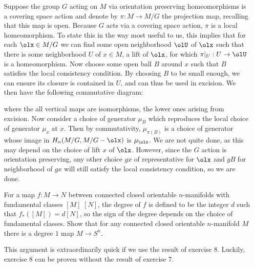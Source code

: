 \begin{homework}[e]
  \begin{prf}
    Suppose the group $G$ acting on $M$ via orientation preserving homeomorphisms is a covering space action and denote by $\pi:M\to M/G$ the projection map, recalling that this map is open. Because $G$ acts via a covering space action, $\pi$ is a local homeomorphism. To state this in the way most useful to us, this implies that for each $\olx \in M/G$ we can find some open neighborhood $\olU$ of $\olx$ such that there is some neighborhood $U$ of $x\in M$, a lift of $\olx$, for which $\pi|_U:U\to \olU$ is a homeomorphism. Now choose some open ball $B$ around $x$ such that $B$ satisfies the local consistency condition. By choosing $B$ to be small enough, we can ensure its closure is contained in $U$, and can thus be used in excision. We then have the following commutative diagram:
    \begin{center}
    \end{center}
    where the all vertical maps are isomorphisms, the lower ones arising from excision. Now consider a choice of generator $\mu_B$ which reproduces the local choice of generator $\mu_x$ at $x$. Then by commutativity, $\mu_{\pi(B)}$ is a choice of generator whose image in $H_n(M/G,M/G - \olx)$ is $\mu_{\olx}$. We are not quite done, as this may depend on the choice of lift $x$ of $\olx$. However, since the $G$ action is orientation preserving, any other choice $gx$ of representative for $\olx$ and $gB$ for neighborhood of $gx$ will still satisfy the local consistency condition, so we are done.
  \end{prf}
   For a map $f:M\to N$ between connected closed orientable $n$-manifolds with fundamental classes $[M]$ $[N]$, the degree of $f$ is defined to be the integer $d$ such that $f_*([M]) = d[N]$, so the sign of the degree depends on the choice of fundamental classes. Show that for any connected closed orientable $n$-manifold $M$ there is a degree $1$ map $M\to S^n$.
  \begin{prf}
    This argument is extraordinarily quick if we use the result of exercise 8. Luckily, exercise 8 can be proven without the result of exercise 7.


\end{prf}
\end{homework}

